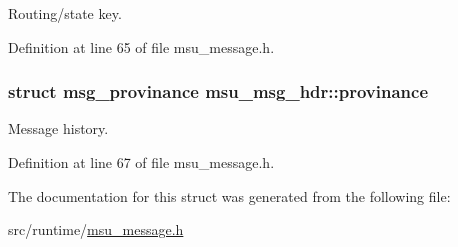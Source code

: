 Routing/state key. 



Definition at line 65 of file msu\-\_\-message.\-h.

\hypertarget{structmsu__msg__hdr_ab64c7b4c508dd04d23bbd940cd6dabea}{
\subsubsection[{provinance}]{\setlength{\rightskip}{0pt plus 5cm}struct {\bf msg\-\_\-provinance} msu\-\_\-msg\-\_\-hdr\-::provinance}}\label{structmsu__msg__hdr_ab64c7b4c508dd04d23bbd940cd6dabea}


Message history. 



Definition at line 67 of file msu\-\_\-message.\-h.



The documentation for this struct was generated from the following file\-:\begin{DoxyCompactItemize}
\item 
src/runtime/\hyperlink{msu__message_8h}{msu\-\_\-message.\-h}\end{DoxyCompactItemize}
